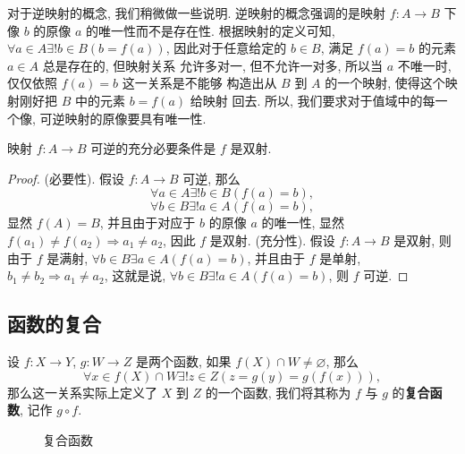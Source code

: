 \documentclass[10pt,UTF8]{book} %
\begin{document}
对于逆映射的概念, 我们稍微做一些说明.
逆映射的概念强调的是映射 $f:A \to B$ 下像 $b$ 的原像 $a$ 的唯一性而不是存在性.
根据映射的定义可知, $\forall a \in A \exists! b \in B \left( b=f(a) \right)$,
因此对于任意给定的 $b \in B$, 满足 $f(a) = b$ 的元素 $a \in A$ 总是存在的, 但映射关系
允许多对一, 但不允许一对多, 所以当 $a$ 不唯一时, 仅仅依照 $f(a) = b$ 这一关系是不能够
构造出从 $B$ 到 $A$ 的一个映射, 使得这个映射刚好把 $B$ 中的元素 $b = f(a)$ 给映射
回去. 所以, 我们要求对于值域中的每一个像, 可逆映射的原像要具有唯一性.

\begin{thm}
    映射 $f:A \to B$ 可逆的充分必要条件是 $f$ 是双射.
    \begin{proof}
        (必要性). 假设 $f: A \to B$ 可逆, 那么
        \[ \forall a \in A \exists ! b \in B \left( f(a) = b \right), \]
        \[ \forall b \in B \exists ! a \in A \left( f(a) = b \right), \]
        显然 $f(A) = B$, 并且由于对应于 $b$ 的原像 $a$ 的唯一性, 显然
        $f(a_1) \ne f(a_2) \Longrightarrow a_1 \ne a_2$, 因此 $f$ 是双射.
        \newline (充分性). 假设 $f: A \to B$ 是双射, 则
        由于 $f$ 是满射, $\forall b \in B \exists a \in A \left( f(a) = b \right)$,
        并且由于 $f$ 是单射, $b_1 \ne b_2 \Longrightarrow a_1 \ne a_2$,
        这就是说, $\forall b \in B \exists ! a \in A \left( f(a) = b \right)$,
        则 $f$ 可逆.
    \end{proof}
\end{thm}



\subsection{函数的复合}

\begin{definition}[复合函数]
    设 $f:X \to Y$, $g: W \to Z$ 是两个函数, 如果 $f(X) \cap W \ne \varnothing$,
    那么 \[ \forall x \in f(X)\cap W \exists! z \in Z \left(
        z = g(y) = g(f(x))
    \right),\] 那么这一关系实际上定义了 $X$ 到 $Z$ 的一个函数, 我们将其称为 $f$ 与
    $g$ 的\textbf{复合函数}, 记作 $g \circ f$.
\end{definition}

\begin{figure}[H]
    \centering
    \caption{复合函数}
    \label{figure: 复合函数}
\end{figure}
\end{document}
